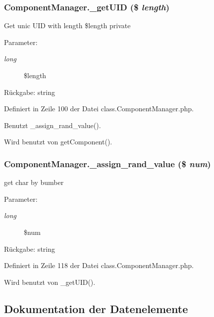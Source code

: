 \subsubsection{\setlength{\rightskip}{0pt plus 5cm}ComponentManager.\_\-getUID (\$ {\em length})}\label{classComponentManager_74032b7e41d550f35833ff1ca1d25e77}


Get unic UID with length \$length  private \begin{Desc}
\item[Parameter:]
\begin{description}
\item[{\em long}]\$length \end{description}
\end{Desc}
\begin{Desc}
\item[Rückgabe:]string \end{Desc}


Definiert in Zeile 100 der Datei class.ComponentManager.php.

Benutzt \_\-assign\_\-rand\_\-value().

Wird benutzt von getComponent().
\subsubsection{\setlength{\rightskip}{0pt plus 5cm}ComponentManager.\_\-assign\_\-rand\_\-value (\$ {\em num})}\label{classComponentManager_d89866f2f3e17789cb467aeb08d2f0d7}


get char by bumber

\begin{Desc}
\item[Parameter:]
\begin{description}
\item[{\em long}]\$num \end{description}
\end{Desc}
\begin{Desc}
\item[Rückgabe:]string \end{Desc}


Definiert in Zeile 118 der Datei class.ComponentManager.php.

Wird benutzt von \_\-getUID().

\subsection{Dokumentation der Datenelemente}
